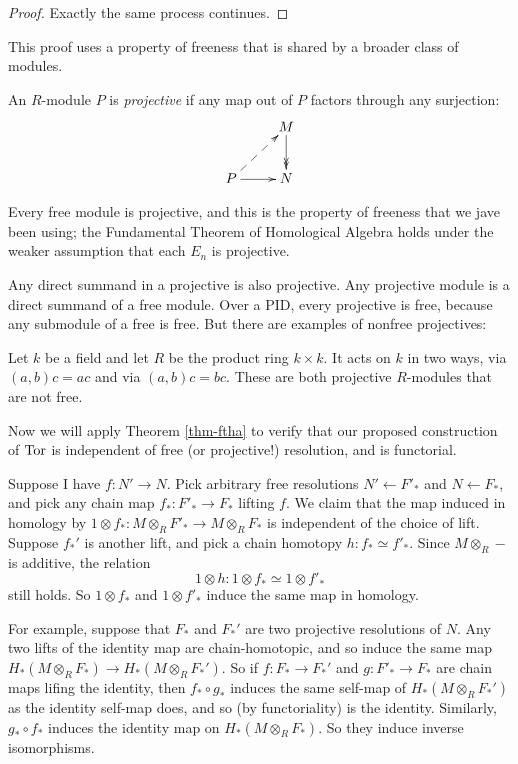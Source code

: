 \begin{proof}
Exactly the same process continues.
\end{proof}

This proof uses a property of freeness that is shared by a broader class of
modules. 

\begin{definition}
An $R$-module $P$ is {\em projective} if any map out of $P$ factors through 
any surjection:
\begin{equation*}
\xymatrix{ & M\ar@{->>}[d]\\
P\ar@{-->}[ur]\ar[r] & N}
\end{equation*}
\end{definition}
Every free module is projective, and this is the property of freeness that we 
jave been using; the Fundamental Theorem of Homological Algebra holds under
the weaker assumption that each $E_n$ is projective.
 
Any direct summand in a projective is also projective. Any projective module is a direct summand of a free module. Over a PID, every projective is free, because any submodule of a free is free. But there are examples of
nonfree projectives: 
\begin{example}
Let $k$ be a field and let $R$ be the product ring $k\times k$. It acts on $k$
in two ways, via $(a,b)c=ac$ and via $(a,b)c=bc$. These are both projective 
$R$-modules that are not free.
\end{example}

Now we will apply Theorem \ref{thm-ftha}
to verify that our proposed construction of 
$\operatorname{Tor}$ is independent of free (or projective!) resolution, and is functorial. 

Suppose I have $f:N'\to N$. Pick arbitrary free resolutions 
$N'\leftarrow F'_*$ and $N\leftarrow F_*$, and pick any chain map 
$f_*:F'_*\to F_*$ lifting $f$. We claim that the map
induced in homology by $1\otimes f_*:M\otimes_RF'_*\to M\otimes_RF_*$
is independent of the choice of lift. Suppose $f_*'$ is another lift,
and pick a chain homotopy $h:f_*\simeq f'_*$. Since $M\otimes_R-$ is additive, 
the relation 
\[
1\otimes h:1\otimes f_*\simeq 1\otimes f'_*
\] 
still holds. So $1\otimes f_*$ and $1\otimes f'_*$ 
induce the same map in homology.

For example, suppose that $F_*$ and $F_*'$ are two projective resolutions of 
$N$. Any two lifts of the identity map are chain-homotopic, and so induce
the same map $H_*(M\otimes_RF_*)\to H_*(M\otimes_RF_*')$. So if $f:F_*\to F_*'$
and $g:F'_*\to F_*$ are chain maps lifing the identity, then $f_*\circ g_*$
induces the same self-map of $H_*(M\otimes_RF_*')$ as the identity self-map 
does, and so (by functoriality) is the identity. Similarly, $g_*\circ f_*$
induces the identity map on $H_*(M\otimes_RF_*)$. So they induce inverse
isomorphisms. 


